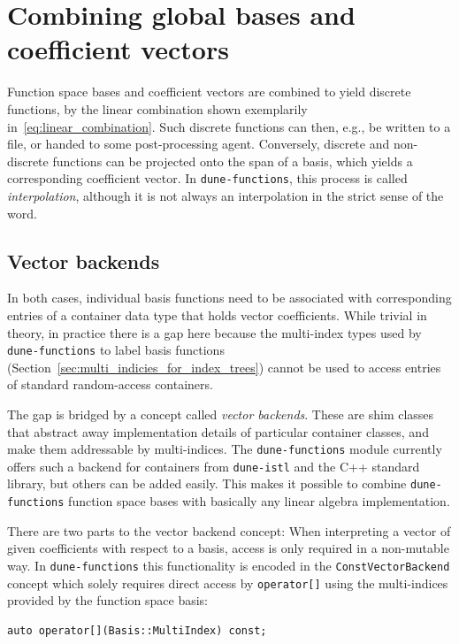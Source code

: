 \documentclass[a4paper,10pt,headings=normal,bibliography=totoc]{scrartcl}
\newcommand{\cpp}[1]{\lstinline[basicstyle=\ttfamily]!#1!}
\newcommand{\dunemodule}[1]{\texttt{#1}}
\begin{document}
\section{Combining global bases and coefficient vectors}

Function space bases and coefficient vectors are combined to yield discrete functions,
by the linear combination shown exemplarily in~\eqref{eq:linear_combination}.
Such discrete functions can then, e.g., be written to a file, or handed to some
post-processing agent. Conversely, discrete and non-discrete functions can be
projected onto the span of a basis, which yields a corresponding coefficient
vector.  In \dunemodule{dune-functions}, this process is called \emph{interpolation},
although it is not always an interpolation in the strict sense of the word.

\subsection{Vector backends}

In both cases, individual basis functions need to be associated with corresponding
entries of a container data type that holds vector coefficients. While trivial
in theory, in practice there is a gap here because the multi-index types used
by \dunemodule{dune-functions} to label basis functions (Section~\ref{sec:multi_indicies_for_index_trees})
cannot be used to access entries of standard random-access containers.

The gap is bridged by a concept called \emph{vector backends}.
These are shim classes that abstract away implementation details of particular
container classes, and make them addressable by multi-indices.
The \dunemodule{dune-functions} module currently offers such a backend
for containers from \dunemodule{dune-istl} and the C++ standard library,
but others can be added easily. This makes it possible to combine \dunemodule{dune-functions}
function space bases with basically any linear algebra implementation.

There are two parts to the vector backend concept:
When interpreting a vector of given coefficients with respect
to a basis,  access is only required in a non-mutable way.
In \dunemodule{dune-functions}
this functionality is encoded in the \cpp{ConstVectorBackend} concept which
solely requires direct access by \cpp{operator[]} using the multi-indices
provided by the function space basis:
\begin{lstlisting}[style=Interface]
  auto operator[](Basis::MultiIndex) const;
\end{lstlisting}
\end{document}
